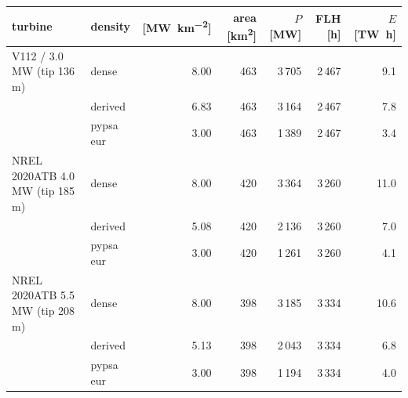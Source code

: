 \begin{tabular}{llrrrrr}
\toprule
turbine & density & [\si{\mega\watt\per\square\kilo\metre}] & area [\si{\square\kilo\metre}] & $P$ [\si{\mega\watt}] & FLH [\si{\hour}] & $E$ [\si{\tera\watt\hour}] \\
\midrule
V112 / 3.0 MW (tip 136 m) & dense & 8.00 & 463 & 3\,705 & 2\,467 & 9.1 \\
 & derived & 6.83 & 463 & 3\,164 & 2\,467 & 7.8 \\
 & pypsa eur & 3.00 & 463 & 1\,389 & 2\,467 & 3.4 \\
\midrule
NREL 2020ATB 4.0 MW (tip 185 m) & dense & 8.00 & 420 & 3\,364 & 3\,260 & 11.0 \\
 & derived & 5.08 & 420 & 2\,136 & 3\,260 & 7.0 \\
 & pypsa eur & 3.00 & 420 & 1\,261 & 3\,260 & 4.1 \\
\midrule
NREL 2020ATB 5.5 MW (tip 208 m) & dense & 8.00 & 398 & 3\,185 & 3\,334 & 10.6 \\
 & derived & 5.13 & 398 & 2\,043 & 3\,334 & 6.8 \\
 & pypsa eur & 3.00 & 398 & 1\,194 & 3\,334 & 4.0 \\
\bottomrule
\end{tabular}